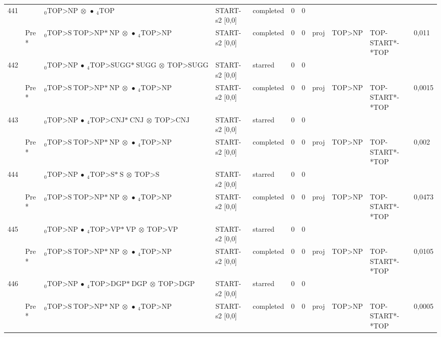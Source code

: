 \documentclass[10pt]{article}
\begin{document}
\begin{longtable}[htbp]{lllllllllll}
441 & & $ {}_0 \textrm{TOP>NP} \  \otimes \  \bullet \ {}_{4} \textrm{TOP} $ & START-s2 [0,0] & completed & 0 & 0 & & & & \\ 
 & Pre *& $ {}_0 \textrm{TOP>S} \ \textrm{TOP>NP*} \ \textrm{NP} \  \otimes \  \bullet \ {}_{4} \textrm{TOP>NP} $ & START-s2 [0,0] & completed & 0 & 0 & proj & TOP>NP & TOP-START*-*TOP & 0,011 \\ 
442 & & $ {}_0 \textrm{TOP>NP} \  \bullet \ {}_{4} \textrm{TOP>SUGG*} \ \textrm{SUGG} \  \otimes \ \textrm{TOP>SUGG} $ & START-s2 [0,0] & starred & 0 & 0 & & & & \\ 
 & Pre *& $ {}_0 \textrm{TOP>S} \ \textrm{TOP>NP*} \ \textrm{NP} \  \otimes \  \bullet \ {}_{4} \textrm{TOP>NP} $ & START-s2 [0,0] & completed & 0 & 0 & proj & TOP>NP & TOP-START*-*TOP & 0,0015 \\ 
443 & & $ {}_0 \textrm{TOP>NP} \  \bullet \ {}_{4} \textrm{TOP>CNJ*} \ \textrm{CNJ} \  \otimes \ \textrm{TOP>CNJ} $ & START-s2 [0,0] & starred & 0 & 0 & & & & \\ 
 & Pre *& $ {}_0 \textrm{TOP>S} \ \textrm{TOP>NP*} \ \textrm{NP} \  \otimes \  \bullet \ {}_{4} \textrm{TOP>NP} $ & START-s2 [0,0] & completed & 0 & 0 & proj & TOP>NP & TOP-START*-*TOP & 0,002 \\ 
444 & & $ {}_0 \textrm{TOP>NP} \  \bullet \ {}_{4} \textrm{TOP>S*} \ \textrm{S} \  \otimes \ \textrm{TOP>S} $ & START-s2 [0,0] & starred & 0 & 0 & & & & \\ 
 & Pre *& $ {}_0 \textrm{TOP>S} \ \textrm{TOP>NP*} \ \textrm{NP} \  \otimes \  \bullet \ {}_{4} \textrm{TOP>NP} $ & START-s2 [0,0] & completed & 0 & 0 & proj & TOP>NP & TOP-START*-*TOP & 0,0473 \\ 
445 & & $ {}_0 \textrm{TOP>NP} \  \bullet \ {}_{4} \textrm{TOP>VP*} \ \textrm{VP} \  \otimes \ \textrm{TOP>VP} $ & START-s2 [0,0] & starred & 0 & 0 & & & & \\ 
 & Pre *& $ {}_0 \textrm{TOP>S} \ \textrm{TOP>NP*} \ \textrm{NP} \  \otimes \  \bullet \ {}_{4} \textrm{TOP>NP} $ & START-s2 [0,0] & completed & 0 & 0 & proj & TOP>NP & TOP-START*-*TOP & 0,0105 \\ 
446 & & $ {}_0 \textrm{TOP>NP} \  \bullet \ {}_{4} \textrm{TOP>DGP*} \ \textrm{DGP} \  \otimes \ \textrm{TOP>DGP} $ & START-s2 [0,0] & starred & 0 & 0 & & & & \\ 
 & Pre *& $ {}_0 \textrm{TOP>S} \ \textrm{TOP>NP*} \ \textrm{NP} \  \otimes \  \bullet \ {}_{4} \textrm{TOP>NP} $ & START-s2 [0,0] & completed & 0 & 0 & proj & TOP>NP & TOP-START*-*TOP & 0,0005 \\ 

\end{longtable}
\end{document}
